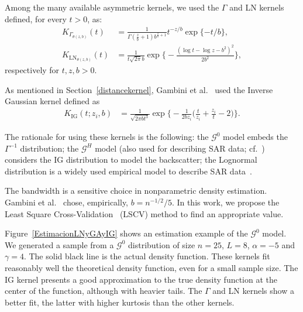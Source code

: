 \documentclass[twocolumn]{svjour3}
\begin{document}
	Among the many available asymmetric kernels, we used the $\Gamma$ and LN kernels defined, for every $t>0$, as:
	\begin{align}
		K_{{\Gamma}_{{\theta}(z,b)}}(t) & =\frac{1}{\Gamma(\frac{z}{b}+1)b^{\frac{z}{b}+1}} t^{-{z}/{b}} \exp\{-{t}/{b}\},
		\label{gammakernel}\\
		K_{{\text{{LN}}}_{{\theta}(z,b)}}(t) & =\frac{1}{t \sqrt{2 \pi} b} \exp\Big\{-\frac{\left(\log t - \log z -b^2\right)^2}{2b^2}\Big\},
		\label{LNkernel}
	\end{align}
	respectively for $t,z,b>0$.
	
	As mentioned in Section~\ref{distancekernel}, Gambini et al.~\cite{gambini2015} used the Inverse Gaussian kernel defined as
	\begin{align}
		K_{\text{IG}}( t; z_i,b) & =\frac{1}{\sqrt{2\pi b t^3}} 
		\exp\Big\{-\frac{1}{2b z_i} \Big(\frac{t}{z_i}+\frac{z_i}{t}-2\Big)\Big\}.
	\end{align}
	
	The rationale for using these kernels is the following:
	the $\mathcal{G}^0$ model embeds the $\Gamma^{-1}$ distribution;
	the $\mathcal{G}^H$ model (also used for describing SAR data; cf.~\cite{PolarimetricSegmentationBSplinesMSSP}) considers the IG distribution to model the backscatter;
	the Lognormal distribution is a widely used empirical model to describe SAR data~\cite{Gao2010}. 
	
	The bandwidth is a sensitive choice in nonparametric density estimation. 
	Gambini et al.~\cite{gambini2015} chose, empirically, $b=n^{-1/2}/5$. 
	In this work, we propose the Least Square Cross-Validation~\cite{Wu1997} (LSCV) method to find an appropriate value.
	
	Figure~\ref{EstimacionLNyGAyIG} shows an estimation example of the $\mathcal{G}^0$ model. 
	We generated a sample from a $\mathcal{G}^0$ distribution of size $n=25$, $L = 8$, $\alpha=-5$ and $\gamma=4$. 
	The solid black line is the actual density function. 
	These kernels fit reasonably well the theoretical density function, even for a small sample size. 
	The IG kernel presents a good approximation to the true density function at the center of the function, although with heavier tails. 
	The $\Gamma$ and LN kernels show a better fit, the latter with higher kurtosis than the other kernels.
	
\end{document}
